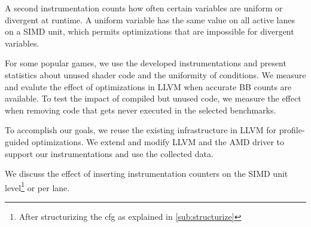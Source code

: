 A second instrumentation counts how often certain variables are uniform or divergent at runtime. A uniform variable has the same value on all active lanes on a SIMD unit, which permits optimizations that are impossible for divergent variables.

For some popular games, we use the developed instrumentations and present statistics about unused shader code and the uniformity of conditions. We measure and evalute the effect of optimizations in LLVM when accurate BB counts are available. To test the impact of compiled but unused code, we measure the effect when removing code that gets never executed in the selected benchmarks.

To accomplish our goals, we reuse the existing infrastructure in LLVM for profile-guided optimizations. We extend and modify LLVM and the AMD driver to support our instrumentations and use the collected data.

We discuss the effect of inserting instrumentation counters on the SIMD unit level\footnote{After structurizing the \gls{cfg} as explained in \cref{sub:structurize}} or per lane.
